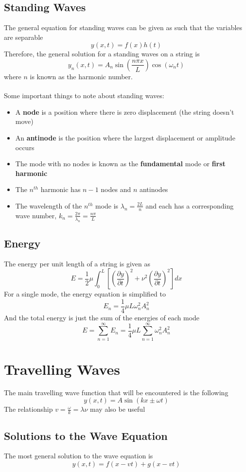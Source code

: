 \documentclass[11pt]{article}
\begin{document}
\subsection{Standing Waves}
The general equation for standing waves can be given as such that the variables are separable
$$ y(x,t) = f(x)h(t)$$ 
Therefore, the general solution for a standing waves on a string is
$$ y_n(x,t) = A_n \sin \left(\frac{n\pi x}{L}\right) \cos (\omega _n t)$$
where $n$ is known as the harmonic number. 
\\ \\
Some important things to note about standing waves:
\begin{itemize}
\item A \textbf{node} is a position where there is zero displacement (the string doesn't move)
\item An \textbf{antinode} is the position where the largest displacement or amplitude occurs
\item The mode with no nodes is known as the \textbf{fundamental} mode or \textbf{first harmonic}
\item The $n^{th}$ harmonic has $n-1$ nodes and $n$ antinodes
\item The wavelength of the $n^{th}$ mode is $\lambda_n = \frac{2L}{n}$ and each has a corresponding wave number, $k_n = \frac{2\pi}{\lambda_n} = \frac{n\pi}{L}$
\end{itemize}
\subsection{Energy}
The energy per unit length of a string is given as
$$E = \frac{1}{2} \mu \int_0^L \left[ \left(\frac{\partial y}{\partial t}\right)^2 + \nu^2 \left(\frac{\partial y}{\partial t}\right)^2 \right] dx $$
For a single mode, the energy equation is simplified to 
$$ E_n = \frac{1}{4}\mu L \omega_n^2A_n^2$$ And the total energy is just the sum of the energies of each mode
$$ E = \sum_{n=1}^{\infty} E_n = \frac{1}{4}\mu L \sum_{n=1}^{\infty} \omega_n^2A_n^2$$
\pagebreak
\section{Travelling Waves}
The main travelling wave function that will be encountered is the following 
$$y(x,t) = A \sin (kx \pm \omega t)$$ 
The relationship  $v = \frac{\omega}{k} = \lambda \nu$ may also be useful
\subsection{Solutions to the Wave Equation}
The most general solution to the wave equation is $$y(x,t) = f(x-vt) + g(x-vt)$$
\end{document}
